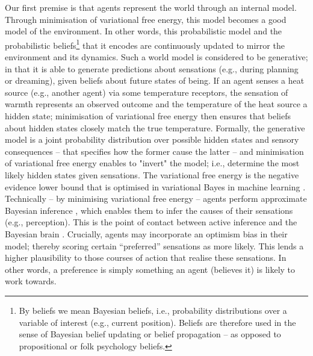 \documentclass[review,12pt,authoryear]{elsarticle}
\begin{document}
Our first premise is that agents represent the world through an internal model. Through minimisation of variational free energy, this model becomes a good model of the environment. In other words, this probabilistic model and the probabilistic beliefs\footnote{By beliefs we mean Bayesian beliefs, i.e., probability distributions over a variable of interest (e.g., current position). Beliefs are therefore used in the sense of Bayesian belief updating or belief propagation – as opposed to propositional or folk psychology beliefs.} that it encodes are continuously updated to mirror the environment and its dynamics. Such a world model is considered to be generative; in that it is able to generate predictions about sensations (e.g., during planning or dreaming), given beliefs about future states of being. If an agent senses a heat source (e.g., another agent) via some temperature receptors, the sensation of warmth represents an observed outcome and the temperature of the heat source a hidden state; minimisation of variational free energy then ensures that beliefs about hidden states closely match the true temperature. Formally, the generative model is a joint probability distribution over possible hidden states and sensory consequences – that specifies how the former cause the latter -- and minimisation of variational free energy enables to "invert" the model; i.e., determine the most likely hidden states given sensations. The variational free energy is the negative evidence lower bound that is optimised in variational Bayes in machine learning \citep{bishopPatternRecognitionMachine2006,xitongUnderstandingVariationalLower2017}. Technically – by minimising variational free energy – agents perform approximate Bayesian inference \citep{senguptaApproximateBayesianInference2016,senguptaNeuronalGaugeTheory2016}, which enables them to infer the causes of their sensations (e.g., perception). This is the point of contact between active inference and the Bayesian brain \citep{aitchisonYouPredictiveCoding2017,fristonHistoryFutureBayesian2012,knillBayesianBrainRole2004}. Crucially, agents may incorporate an optimism bias \citep{mckayEvolutionMisbelief2009,sharotOptimismBias2011} in their model; thereby scoring certain “preferred” sensations as more likely. This lends a higher plausibility to those courses of action that realise these sensations. In other words, a preference is simply something an agent (believes it) is likely to work towards.
\end{document}
